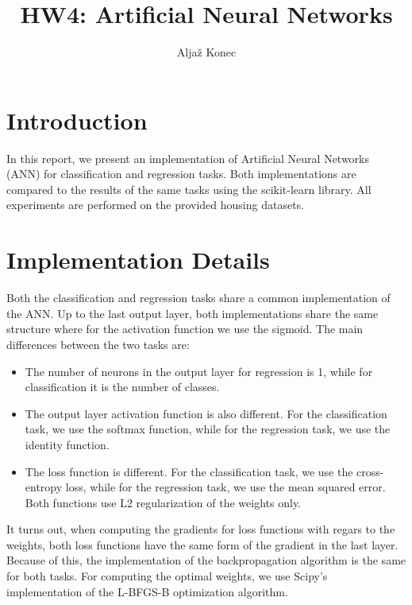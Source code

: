 \documentclass[9pt]{IEEEtran}
\title{\vspace{0ex} HW4: Artificial Neural Networks}
\author{Aljaž Konec\vspace{-4.0ex}}
\begin{document}
\maketitle

\section{Introduction}

In this report, we present an implementation of Artificial Neural Networks (ANN) for classification and regression tasks.
Both implementations are compared to the results of the same tasks using the scikit-learn library.
All experiments are performed on the provided housing datasets.


\section{Implementation Details}

Both the classification and regression tasks share a common implementation of the ANN.
Up to the last output layer, both implementations share the same structure where for the activation function we use the sigmoid.
The main differences between the two tasks are:
\begin{itemize}
    \item The number of neurons in the output layer for regression is 1, while for classification it is the number of classes.
    \item The output layer activation function is also different. For the classification task, we use the softmax function, while for the regression task, we use the identity function.
    \item The loss function is different. For the classification task, we use the cross-entropy loss, while for the regression task, we use the mean squared error. Both functions use L2 regularization of the weights only.
\end{itemize}
It turns out, when computing the gradients for loss functions with regars to the weights, both loss functions have the same form of the gradient in the last layer.
Because of this, the implementation of the backpropagation algorithm is the same for both tasks.
For computing the optimal weights, we use Scipy's implementation of the L-BFGS-B optimization algorithm.
\end{document}

